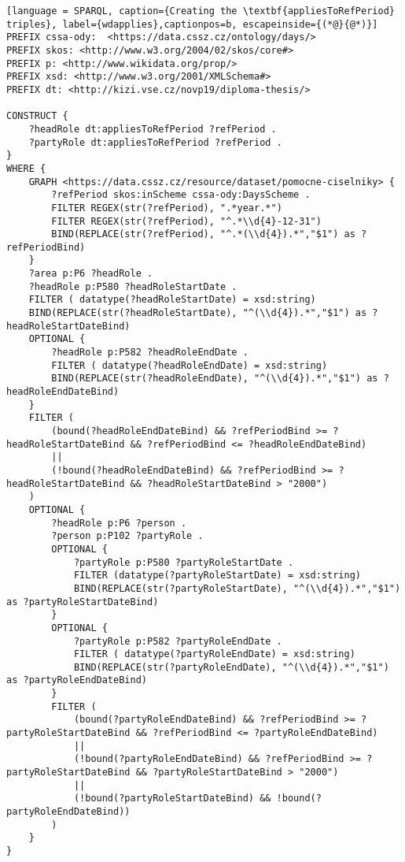 \begin{lstlisting}[language = SPARQL, caption={Creating the \textbf{appliesToRefPeriod} triples}, label={wdapplies},captionpos=b, escapeinside={(*@}{@*)}]
PREFIX cssa-ody:  <https://data.cssz.cz/ontology/days/>
PREFIX skos: <http://www.w3.org/2004/02/skos/core#>
PREFIX p: <http://www.wikidata.org/prop/>
PREFIX xsd: <http://www.w3.org/2001/XMLSchema#>
PREFIX dt: <http://kizi.vse.cz/novp19/diploma-thesis/>
    
CONSTRUCT {
    ?headRole dt:appliesToRefPeriod ?refPeriod .
    ?partyRole dt:appliesToRefPeriod ?refPeriod .
}
WHERE {
    GRAPH <https://data.cssz.cz/resource/dataset/pomocne-ciselniky> {
        ?refPeriod skos:inScheme cssa-ody:DaysScheme .
        FILTER REGEX(str(?refPeriod), ".*year.*")
        FILTER REGEX(str(?refPeriod), "^.*\\d{4}-12-31")
        BIND(REPLACE(str(?refPeriod), "^.*(\\d{4}).*","$1") as ?refPeriodBind)
    }
    ?area p:P6 ?headRole .
    ?headRole p:P580 ?headRoleStartDate .
    FILTER ( datatype(?headRoleStartDate) = xsd:string)	
    BIND(REPLACE(str(?headRoleStartDate), "^(\\d{4}).*","$1") as ?headRoleStartDateBind)
    OPTIONAL {
        ?headRole p:P582 ?headRoleEndDate .
        FILTER ( datatype(?headRoleEndDate) = xsd:string)	
        BIND(REPLACE(str(?headRoleEndDate), "^(\\d{4}).*","$1") as ?headRoleEndDateBind)
    }
    FILTER (
        (bound(?headRoleEndDateBind) && ?refPeriodBind >= ?headRoleStartDateBind && ?refPeriodBind <= ?headRoleEndDateBind)
        ||
        (!bound(?headRoleEndDateBind) && ?refPeriodBind >= ?headRoleStartDateBind && ?headRoleStartDateBind > "2000")
    )
    OPTIONAL {
        ?headRole p:P6 ?person .
        ?person p:P102 ?partyRole .
        OPTIONAL {
            ?partyRole p:P580 ?partyRoleStartDate .
            FILTER (datatype(?partyRoleStartDate) = xsd:string)	
            BIND(REPLACE(str(?partyRoleStartDate), "^(\\d{4}).*","$1") as ?partyRoleStartDateBind)
        }
        OPTIONAL {
            ?partyRole p:P582 ?partyRoleEndDate .
            FILTER ( datatype(?partyRoleEndDate) = xsd:string)	
            BIND(REPLACE(str(?partyRoleEndDate), "^(\\d{4}).*","$1") as ?partyRoleEndDateBind)
        }
        FILTER (
            (bound(?partyRoleEndDateBind) && ?refPeriodBind >= ?partyRoleStartDateBind && ?refPeriodBind <= ?partyRoleEndDateBind)
            ||
            (!bound(?partyRoleEndDateBind) && ?refPeriodBind >= ?partyRoleStartDateBind && ?partyRoleStartDateBind > "2000")
            ||
            (!bound(?partyRoleStartDateBind) && !bound(?partyRoleEndDateBind))
        )
    }
}
\end{lstlisting}